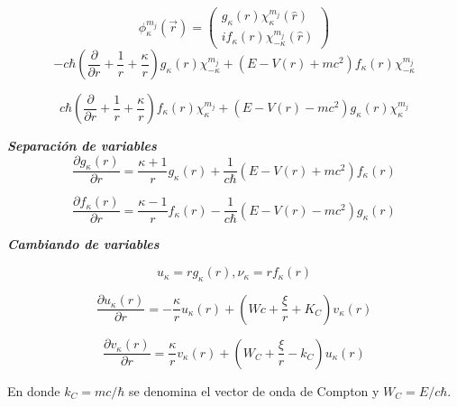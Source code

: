 \documentclass{beamer}
\begin{document}
\begin{frame}
\begin{equation}\label{eq:funciondeonda}
\phi^{m_j}_{\kappa} (\vec{r} ) = \left( \substack{g_{\kappa}(r)\chi^{m_j}_\kappa (\hat{r}) \\ if_\kappa(r)\chi^{m_j}_{-\kappa} (\hat{r}) } \right) 
\end{equation}
\begin{equation}
-c \hbar  \left( \frac{\partial}{\partial r}+\frac{1}{r}+\frac{\kappa}{r} \right) g_{\kappa}(r)\chi^{m_j}_{-\kappa} +(E-V(r)+mc^2)f_{\kappa}(r)\chi^{m_j}_{-\kappa}
\end{equation}


\begin{equation}
c \hbar  \left( \frac{\partial}{\partial r}+\frac{1}{r}+\frac{\kappa}{r} \right) f_{\kappa}(r)\chi^{m_j}_{\kappa} +(E-V(r)-mc^2)g_{\kappa}(r)\chi^{m_j}_{\kappa}
\end{equation}

\end{frame}

\begin{frame}{\textit{\textbf{Separaci\'on de variables}}}
\begin{equation}
\frac{\partial g_{\kappa}(r)}{\partial r} =\frac{\kappa+1}{r}g_{\kappa}(r)+\frac{1}{c\hbar}(E-V(r)+mc^2)f_{\kappa}(r)
\end{equation}

\begin{equation}
\frac{\partial f_{\kappa}(r)}{\partial r} =\frac{\kappa-1}{r}f_{\kappa}(r)-\frac{1}{c\hbar}(E-V(r)-mc^2)g_{\kappa}(r)
\end{equation}
\end{frame}

\begin{frame}{\textit{\textbf{Cambiando de variables}}}

\[
u_{\kappa} = r g_{\kappa}(r), \nu_{\kappa} = r f_{\kappa}(r)
\]

\begin{equation}\label{eq:Hrad1}
\dfrac{\partial u_{\kappa}(r)}{\partial r} =-\dfrac{\kappa}{r}u_{\kappa}(r)+\left ( Wc+\dfrac{\xi}{r}+K_C \right ) v_{\kappa}(r)
\end{equation}

\begin{equation}\label{eq:Hrad2}
\dfrac{\partial v_{\kappa}(r)}{\partial r} =\dfrac{\kappa}{r}v_{\kappa}(r)+
\left ( W_C + \dfrac{\xi}{r} - k_C \right )u_{\kappa}(r)
\end{equation}

En donde $k_C = mc/\hbar$ se denomina el vector de onda de Compton y 
$W_C = E / c\hbar$.
\end{frame}
\end{document}
